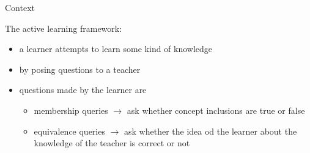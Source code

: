 \documentclass[handout]{beamer}\mode<handout>{\usetheme{AMSBolognaFC}}
\begin{document}
\begin{frame}[c]{Context}
    
    The \alert{active learning} framework:
    \vfill
    \begin{itemize}
        \item a \alert{learner} attempts to learn some kind of \alert{knowledge}
        \item by posing questions to a \alert{teacher}

        \vfill
        
        \item questions made by the learner are
        \begin{itemize}
            \item \alert{membership} queries $\rightarrow$ ask whether \alert{concept inclusions} are true or false
            \item \alert{equivalence} queries $\rightarrow$ ask whether the idea od the learner about the knowledge of the teacher is correct or not
        \end{itemize}
        
        \vfill
        
    \end{itemize}
\end{frame}
\end{document}
